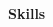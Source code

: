 \noindent\textbf{Skills}
\noindent\hrulefill
\vspace{0.25em}
\begin{adjustwidth}{1.5em}{0em}
\end{adjustwidth}
\vspace{0.25em}